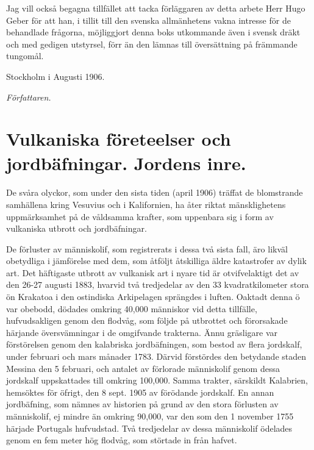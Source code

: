 \documentclass[a4paper, 12pt, oneside, swedish]{article}
\begin{document}
Jag vill också begagna tillfället att tacka förläggaren av detta arbete Herr Hugo Geber för att han, i tillit till den svenska allmänhetens vakna intresse för de behandlade frågorna, möjliggjort denna boks utkommande även i svensk dräkt och med gedigen utstyrsel, förr än den lämnas till översättning på främmande tungomål.

Stockholm i Augusti 1906.

\emph{Författaren.}
\clearpage
\section{Vulkaniska företeelser och jordbäfningar. Jordens inre.}
\paragraph{}
De svåra olyckor, som under den sista tiden (april 1906) träffat de blomstrande samhällena kring Vesuvius och i Kalifornien, ha åter riktat mänsklighetens uppmärksamhet på de våldsamma krafter, som uppenbara sig i form av vulkaniska utbrott och jordbäfningar.

De förluster av människolif, som registrerats i dessa två sista fall, äro likväl obetydliga i jämförelse med dem, som åtföljt åtskilliga äldre katastrofer av dylik art. Det häftigaste utbrott av vulkanisk art i nyare tid är otvifvelaktigt det av den 26-27 augusti 1883, hvarvid två tredjedelar av den 33 kvadratkilometer stora ön Krakatoa i den ostindiska Arkipelagen sprängdes i luften. Oaktadt denna ö var obebodd, dödades omkring 40,000 människor vid detta tillfälle, hufvudsakligen genom den flodvåg, som följde på utbrottet och förorsakade härjande översvämningar i de omgifvande trakterna. Ännu gräsligare var förstörelsen genom den kalabriska jordbäfningen, som bestod av flera jordskalf, under februari och mars månader 1783. Därvid förstördes den betydande staden Messina den 5 februari, och antalet av förlorade människolif genom dessa jordskalf uppskattades till omkring 100,000. Samma trakter, särskildt Kalabrien, hemsöktes för öfrigt, den 8 sept. 1905 av förödande jordskalf. En annan jordbäfning, som nämnes av historien på grund av den stora förlusten av människolif, ej mindre än omkring 90,000, var den som den 1 november 1755 härjade Portugals hufvudstad. Två tredjedelar av dessa människolif ödelades genom en fem meter hög flodvåg, som störtade in från hafvet.
\end{document}
